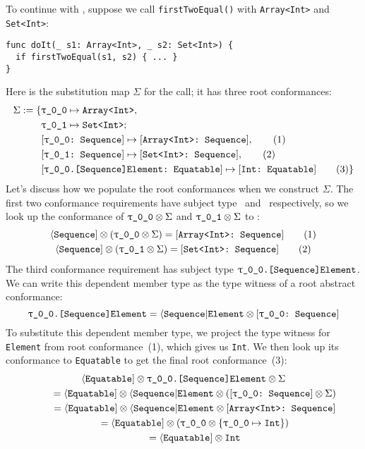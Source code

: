 \documentclass[../generics]{subfiles}
\begin{document}
\begin{example}\label{abstract conformance example 2}
To continue with , suppose we call \texttt{firstTwoEqual()} with \texttt{Array<Int>} and \texttt{Set<Int>}:
\begin{Verbatim}
func doIt(_ s1: Array<Int>, _ s2: Set<Int>) {
  if firstTwoEqual(s1, s2) { ... }
}
\end{Verbatim}
Here is the substitution map $\Sigma$ for the call; it has three root conformances:
\begin{align*}
\Sigma := \{
&\SubstType{\rT}{Array<Int>},\\
&\SubstType{\rU}{Set<Int>};\\
&\SubstConf{\rT}{Array<Int>}{Sequence},\tag{1}\\
&\SubstConf{\rU}{Set<Int>}{Sequence},\tag{2}\\
&\SubstConf{\rT.[Sequence]Element}{Int}{Equatable}\tag{3}
\}
\end{align*}
Let's discuss how we populate the root conformances when we construct $\Sigma$. The first two conformance requirements have subject type \rT\ and \rU\ respectively, so we look up the conformance of $\rT\otimes\Sigma$ and $\rU\otimes\Sigma$ to \tSequence:
\begin{gather*}
\PSequence \otimes (\rT \otimes \Sigma) = \ConfReq{Array<Int>}{Sequence}\tag{1}\\
\PSequence \otimes (\rU \otimes \Sigma) = \ConfReq{Set<Int>}{Sequence}\tag{2}
\end{gather*}
The third conformance requirement has subject type $\texttt{\rT.[Sequence]Element}$. We can write this dependent member type as the type witness of a root abstract conformance:
\[\texttt{\rT.[Sequence]Element} = \AElement \otimes \rTSequence\]
To substitute this dependent member type, we project the type witness for \texttt{Element} from root conformance~(1), which gives us \texttt{Int}. We then look up its conformance to \texttt{Equatable} to get the final root conformance~(3):
\begin{gather*}
\Proto{Equatable} \otimes \texttt{\rT.[Sequence]Element} \otimes \Sigma\\
\qquad {} = \Proto{Equatable} \otimes \AElement \otimes (\rTSequence \otimes \Sigma)\\
\qquad {} = \Proto{Equatable} \otimes \AElement \otimes \ConfReq{Array<Int>}{Sequence}\\
\qquad {} = \Proto{Equatable} \otimes (\rT \otimes \SubMapInt)\\
\qquad {} = \Proto{Equatable} \otimes \texttt{Int}\\

\end{gather*}
\end{example}
\end{document}
